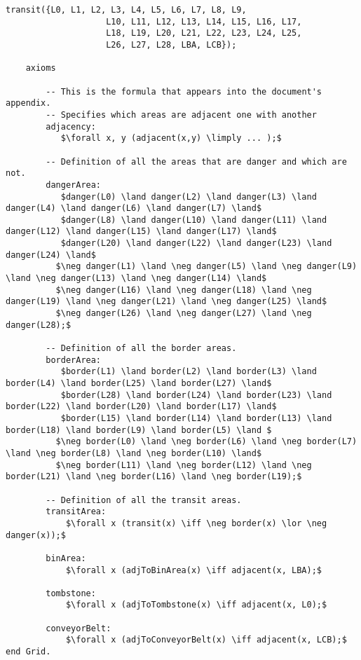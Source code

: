 \begin{lstlisting}[fontadjust, mathescape, frame=single]
            transit({L0, L1, L2, L3, L4, L5, L6, L7, L8, L9,
                    L10, L11, L12, L13, L14, L15, L16, L17,
                    L18, L19, L20, L21, L22, L23, L24, L25,
                    L26, L27, L28, LBA, LCB});

    axioms
        
        -- This is the formula that appears into the document's appendix.
        -- Specifies which areas are adjacent one with another
        adjacency:
           $\forall x, y (adjacent(x,y) \limply ... );$
        
        -- Definition of all the areas that are danger and which are not.
        dangerArea:
           $danger(L0) \land danger(L2) \land danger(L3) \land danger(L4) \land danger(L6) \land danger(L7) \land$
           $danger(L8) \land danger(L10) \land danger(L11) \land danger(L12) \land danger(L15) \land danger(L17) \land$
           $danger(L20) \land danger(L22) \land danger(L23) \land danger(L24) \land$
          $\neg danger(L1) \land \neg danger(L5) \land \neg danger(L9) \land \neg danger(L13) \land \neg danger(L14) \land$
          $\neg danger(L16) \land \neg danger(L18) \land \neg danger(L19) \land \neg danger(L21) \land \neg danger(L25) \land$
          $\neg danger(L26) \land \neg danger(L27) \land \neg danger(L28);$
        
        -- Definition of all the border areas.
        borderArea:
           $border(L1) \land border(L2) \land border(L3) \land border(L4) \land border(L25) \land border(L27) \land$
           $border(L28) \land border(L24) \land border(L23) \land border(L22) \land border(L20) \land border(L17) \land$
           $border(L15) \land border(L14) \land border(L13) \land border(L18) \land border(L9) \land border(L5) \land $
          $\neg border(L0) \land \neg border(L6) \land \neg border(L7) \land \neg border(L8) \land \neg border(L10) \land$
          $\neg border(L11) \land \neg border(L12) \land \neg border(L21) \land \neg border(L16) \land \neg border(L19);$

        -- Definition of all the transit areas.
        transitArea:
            $\forall x (transit(x) \iff \neg border(x) \lor \neg danger(x));$

        binArea:
            $\forall x (adjToBinArea(x) \iff adjacent(x, LBA);$

        tombstone:
            $\forall x (adjToTombstone(x) \iff adjacent(x, L0);$

        conveyorBelt:
            $\forall x (adjToConveyorBelt(x) \iff adjacent(x, LCB);$
end Grid.\end{lstlisting}